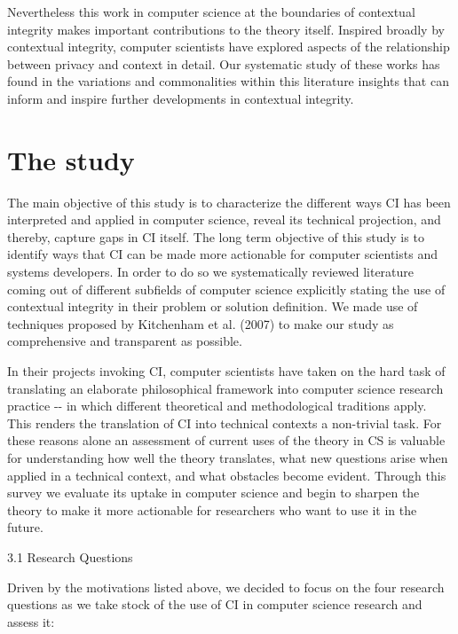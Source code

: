 \documentclass[../thesis.tex]{subfiles}
\begin{document}
\bigskip

Nevertheless this work in computer science at the boundaries of
contextual integrity makes important contributions to the theory
itself. Inspired broadly by contextual integrity, computer scientists
have explored aspects of the relationship between privacy and context
in detail. Our systematic study of these works has found in the
variations and commonalities within this literature insights that can
inform and inspire further developments in contextual integrity.


\bigskip

\section{The study}
\label{CI3}

The main objective of this study is to characterize the different ways
CI has been interpreted and applied in computer science, reveal its
technical projection, and thereby, capture gaps in CI itself. The long
term objective of this study is to identify ways that CI can be made
more actionable for computer scientists and systems developers. In
order to do so we systematically reviewed literature coming out of
different subfields of computer science explicitly stating the use of
contextual integrity in their problem or solution definition. We made
use of techniques proposed by Kitchenham et al. (2007) to make our
study as comprehensive and transparent as possible. 


\bigskip

In their projects invoking CI, computer scientists have taken on the
hard task of translating an elaborate philosophical framework into
computer science research practice -{}- in which different theoretical
and methodological traditions apply. This renders the translation of CI
into technical contexts a non-trivial task. For these reasons alone an
assessment of current uses of the theory in CS is valuable for
understanding how well the theory translates, what new questions arise
when applied in a technical context, and what obstacles become evident.
Through this survey we evaluate its uptake in computer science and
begin to sharpen the theory to make it more actionable for researchers
who want to use it in the future. 

3.1 Research Questions

\textcolor[rgb]{0.2,0.2,0.2}{Driven by the motivations listed above, we
decided to focus on the four research questions as we take stock of the
use of CI in computer science research and assess it:}
\end{document}
